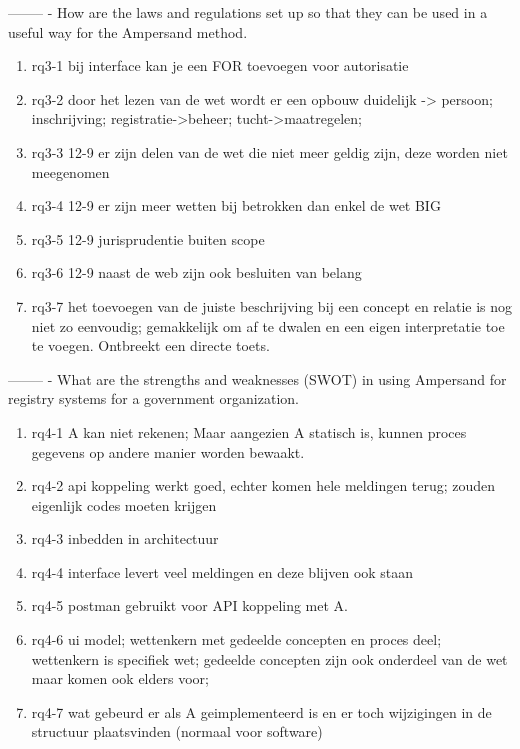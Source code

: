 --------
\newline
[RQ3]- How are the laws and regulations set up so that they can be used in a useful way for the Ampersand method.
\begin{enumerate}
    \item rq3-1 bij interface kan je een FOR toevoegen voor autorisatie
    \item rq3-2 door het lezen van de wet wordt er een opbouw duidelijk -> persoon; inschrijving; registratie->beheer; tucht->maatregelen; 
    \item rq3-3 12-9 er zijn delen van de wet die niet meer geldig zijn, deze worden niet meegenomen
    \item rq3-4 12-9 er zijn meer wetten bij betrokken dan enkel de wet BIG
    \item rq3-5 12-9 jurisprudentie buiten scope
    \item rq3-6 12-9 naast de web zijn ook besluiten van belang
    \item rq3-7 het toevoegen van de juiste beschrijving bij een concept en relatie is nog niet zo eenvoudig; gemakkelijk om af te dwalen en een eigen interpretatie toe te voegen. Ontbreekt een directe toets.
\end{enumerate}
--------
\newline
[RQ4]- What are the strengths and weaknesses (SWOT) in using Ampersand for registry systems for a government organization.
\begin{enumerate}
    \item rq4-1 A kan niet rekenen; Maar aangezien A statisch is, kunnen proces gegevens op andere manier worden bewaakt.
    \item rq4-2 api koppeling werkt goed, echter komen hele meldingen terug; zouden eigenlijk codes moeten krijgen 
    \item rq4-3 inbedden in architectuur 
    \item rq4-4 interface levert veel meldingen en deze blijven ook staan
    \item rq4-5 postman gebruikt voor API koppeling met A. 
    \item rq4-6 ui model; wettenkern met gedeelde concepten en proces deel; wettenkern is specifiek wet; gedeelde concepten zijn ook onderdeel van de wet maar komen ook elders voor;
    \item rq4-7 wat gebeurd er als A geimplementeerd is en er toch wijzigingen in de structuur plaatsvinden (normaal voor software)
\end{enumerate}




